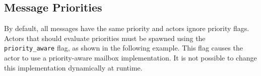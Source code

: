 

\clearpage
\subsection{Message Priorities}

By default, all messages have the same priority and actors ignore priority flags.
Actors that should evaluate priorities must be spawned using the \lstinline^priority_aware^ flag, as shown in the following example.
This flag causes the actor to use a priority-aware mailbox implementation.
It is not possible to change this implementation dynamically at runtime.


